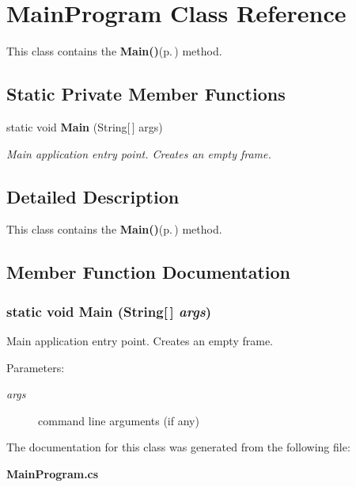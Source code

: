 \section{Main\-Program Class Reference}
\label{class_c_s_image_viewer_1_1_main_program}
This class contains the {\bf Main()}{\rm (p.\,\pageref{class_c_s_image_viewer_1_1_main_program_1f7e61855217a4f3ad075ae5cb5a7cff})} method.  


\subsection*{Static Private Member Functions}
\begin{CompactItemize}
\item 
static void {\bf Main} (String[$\,$] args)
\begin{CompactList}\small\item\em Main application entry point. Creates an empty frame. \item\end{CompactList}\end{CompactItemize}


\subsection{Detailed Description}
This class contains the {\bf Main()}{\rm (p.\,\pageref{class_c_s_image_viewer_1_1_main_program_1f7e61855217a4f3ad075ae5cb5a7cff})} method. 



\subsection{Member Function Documentation}
\subsubsection{\setlength{\rightskip}{0pt plus 5cm}static void Main (String[$\,$] {\em args})\hspace{0.3cm}{\tt  [static, private]}}\label{class_c_s_image_viewer_1_1_main_program_1f7e61855217a4f3ad075ae5cb5a7cff}


Main application entry point. Creates an empty frame. 

\begin{Desc}
\item[Parameters:]
\begin{description}
\item[{\em args}]command line arguments (if any) \end{description}
\end{Desc}


The documentation for this class was generated from the following file:\begin{CompactItemize}
\item 
{\bf Main\-Program.cs}\end{CompactItemize}
